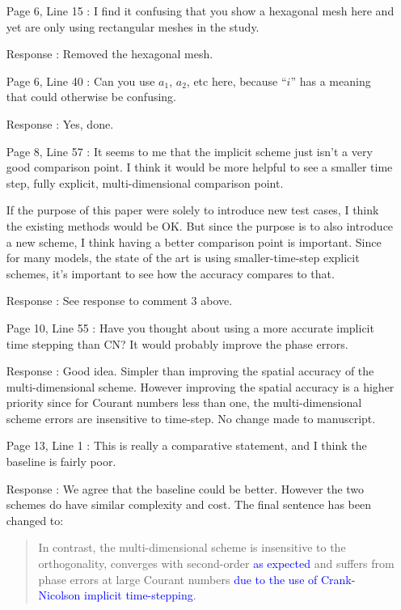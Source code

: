 \documentclass[12pt]{article}
\begin{document}
\begin{enumerate}
\item [Page 6, Line 15]: I find it confusing that you show a hexagonal mesh here and yet are only using rectangular meshes in the study.

\item [Response]: Removed the hexagonal mesh.

\item [Page 6, Line 40]: Can you use $a_1$, $a_2$, etc here, because ``$i$'' has a meaning that could otherwise be confusing.

\item [Response]: Yes, done.

\item [Page 8, Line 57]: It seems to me that the implicit scheme just isn't a very good comparison point. I think it would be more helpful to see a smaller time step, fully explicit, multi-dimensional comparison point.

If the purpose of this paper were solely to introduce new test cases, I think the existing methods would be OK. But since the purpose is to also introduce a new scheme, I think having a better comparison point is important. Since for many models, the state of the art is using smaller-time-step explicit schemes, it's important to see how the accuracy compares to that.

\item [Response]: See response to comment 3 above. 

\item [Page 10, Line 55]: Have you thought about using a more accurate implicit time stepping than CN? It would probably improve the phase errors.

\item [Response]: Good idea. Simpler than improving the spatial accuracy of the multi-dimensional scheme. However improving the spatial accuracy is a higher priority since for Courant numbers less than one, the multi-dimensional scheme errors are insensitive to time-step. No change made to manuscript.

\item [Page 13, Line 1]: This is really a comparative statement, and I think the baseline is fairly poor.

\item [Response]: We agree that the baseline could be better. However the two schemes do have similar complexity and cost. The final sentence has been changed to:
\begin{quote}
In contrast, the multi-dimensional scheme is insensitive to the orthogonality, converges with second-order \textcolor{blue}{as expected} and suffers from phase errors at large Courant numbers \textcolor{blue}{due to the use of Crank-Nicolson implicit time-stepping}.
\end{quote}


\end{enumerate}
\end{document}
